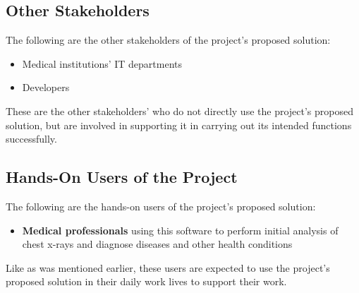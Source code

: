 \documentclass[12pt]{article}
\begin{document}
\subsection{Other Stakeholders}
The following are the other stakeholders of the project’s proposed solution: 
\begin{itemize}
    \item Medical institutions’ IT departments 
    \item Developers 
\end{itemize}
These are the other stakeholders' who do not directly use the project's proposed solution, but are involved in supporting it in carrying out its intended functions successfully.

\subsection{Hands-On Users of the Project}
The following are the hands-on users of the project’s proposed solution:
\begin{itemize}
    \item \textbf{Medical professionals} using this software to perform initial analysis of chest x-rays and diagnose diseases and other health conditions 
\end{itemize}
Like as was mentioned earlier, these users are expected to use the project's proposed solution in their daily work lives to support their work.
\end{document}

